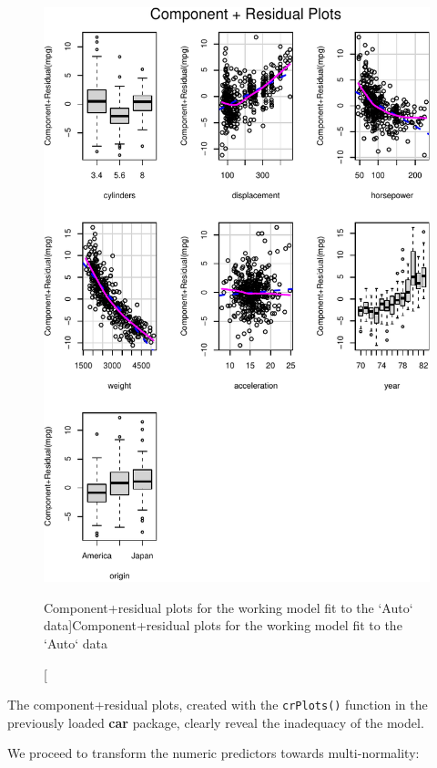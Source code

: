 \documentclass[
]{jss}
\begin{document}
\begin{CodeChunk}
\begin{figure}
{\centering \includegraphics[width=1\linewidth]{JSS-article_files/figure-latex/Auto-working-model-1} 

}

\caption[Component+residual plots for the working model fit to the `Auto` data]{Component+residual plots for the working model fit to the `Auto` data}\label{fig:Auto-working-model}
\end{figure}
\end{CodeChunk}

The component+residual plots, created with the \texttt{crPlots()}
function in the previously loaded \textbf{car} package, clearly reveal
the inadequacy of the model.

We proceed to transform the numeric predictors towards multi-normality:
\end{document}
